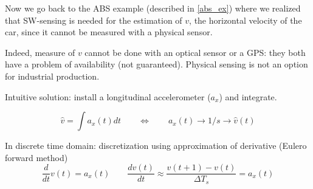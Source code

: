 \begin{example}
Now we go back to the ABS example (described in \ref{abs_ex}) where we realized that SW-sensing is needed for the estimation of $v$, the horizontal velocity of the car, since it cannot be measured with a physical sensor.
    \begin{figure}[H]
        \centering
    \end{figure}

    
    Indeed, measure of $v$ cannot be done with an optical sensor or a GPS:
    they both have a problem of availability (not guaranteed). Physical sensing is not an option for industrial production.

    Intuitive solution: install a longitudinal accelerometer ($a_x$) and integrate.
    \begin{figure}[H]
        \centering
    \end{figure}
    \[
        \hat{v} = \int a_x(t) dt \qquad \iff \qquad a_x(t) \rightarrow 1/s \rightarrow \hat{v}(t)
    \]

    In discrete time domain: discretization using approximation of derivative (Eulero forward method)
    \[
        \frac{d}{dt} v(t) = a_x(t) \qquad \frac{dv(t)}{dt} \approx \frac{v(t+1)-v(t)}{\Delta T_s} = a_x(t)
    \]


\end{example}
